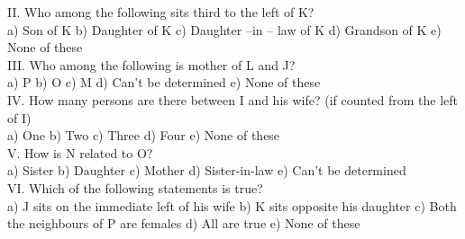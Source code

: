 \documentclass[
]{article}
\begin{document}
II. Who among the following sits third to the left of K?\\
a) Son of K \hspace{2mm}b) Daughter of K
\hspace{2mm}c) Daughter –in – law of K \hspace{2mm}d) Grandson of K \hspace{2mm}e) None of these\\

III. Who among the following is mother of L and J?\\
a) P \hspace{2mm}b) O \hspace{2mm}c) M
\hspace{2mm}d) Can’t be determined \hspace{2mm}e) None of these\\

IV. How many persons are there between I and his wife? (if counted from the left of I)\\
a) One \hspace{2mm}b) Two \hspace{2mm}c) Three \hspace{2mm}d) Four \hspace{2mm}e) None of these\\

V. How is N related to O?\\
a) Sister \hspace{2mm}b) Daughter \hspace{2mm}c) Mother
\hspace{2mm}d) Sister-in-law \hspace{2mm}e) Can’t be determined\\

VI. Which of the following statements is true?\\
a) J sits on the immediate left of his wife \hspace{2mm}b) K sits opposite his daughter
\hspace{2mm}c) Both the neighbours of P are females \hspace{2mm}d) All are true
\hspace{2mm}e) None of these\\
\end{document}

